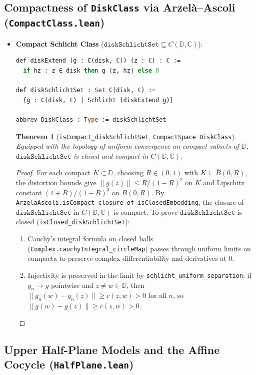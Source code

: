 \documentclass[11pt,reqno]{amsart}
\newtheorem{theorem}{Theorem}[section]
\theoremstyle{definition}
\newcommand{\D}{\mathbb{D}}
\newcommand{\C}{\mathbb{C}}
\begin{document}
\subsection{Compactness of \texttt{DiskClass} via Arzel\`a--Ascoli (\texttt{CompactClass.lean})}

\begin{itemize}
\item \textbf{Compact Schlicht Class} ($\texttt{diskSchlichtSet} \subseteq C(\D, \C)$):
\begin{lstlisting}[language=Caml]
def diskExtend (g : C(disk, ℂ)) (z : ℂ) : ℂ :=
  if hz : z ∈ disk then g ⟨z, hz⟩ else 0

def diskSchlichtSet : Set C(disk, ℂ) :=
  {g : C(disk, ℂ) | Schlicht (diskExtend g)}

abbrev DiskClass : Type := diskSchlichtSet
\end{lstlisting}
\begin{theorem}[\texttt{isCompact\_diskSchlichtSet}, \texttt{CompactSpace DiskClass}]
Equipped with the topology of uniform convergence on compact subsets of $\D$, $\texttt{diskSchlichtSet}$ is closed and compact in $C(\D, \C)$.
\end{theorem}
\begin{proof}
For each compact $K \subset \D$, choosing $R \in (0,1)$ with $K \subseteq \overline{B}(0,R)$, the distortion bounds give $\|g(z)\| \le R/(1-R)^2$ on $K$ and Lipschitz constant $(1+R)/(1-R)^3$ on $\overline{B}(0,R)$. By \texttt{ArzelaAscoli.isCompact\_closure\_of\_isClosedEmbedding}, the closure of $\texttt{diskSchlichtSet}$ in $C(\D,\C)$ is compact. To prove $\texttt{diskSchlichtSet}$ is closed (\texttt{isClosed\_diskSchlichtSet}):
\begin{enumerate}[label=(\roman*)]
\item Cauchy's integral formula on closed balls (\texttt{Complex.cauchyIntegral\_circleMap}) passes through uniform limits on compacta to preserve complex differentiability and derivatives at $0$.
\item Injectivity is preserved in the limit by \texttt{schlicht\_uniform\_separation}: if $g_n \to g$ pointwise and $z \ne w \in \D$, then $\|g_n(w)-g_n(z)\| \ge c(z,w) > 0$ for all $n$, so $\|g(w)-g(z)\| \ge c(z,w) > 0$. \qedhere
\end{enumerate}
\end{proof}
\end{itemize}

\subsection{Upper Half-Plane Models and the Affine Cocycle (\texttt{HalfPlane.lean})}
\end{document}
